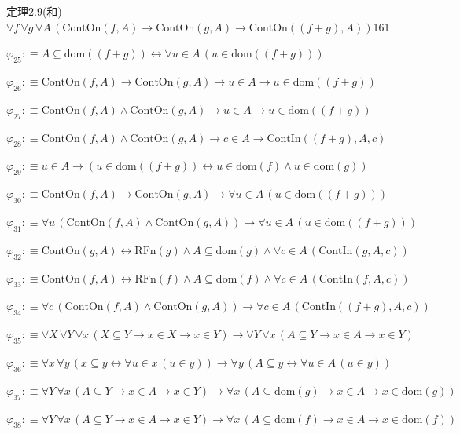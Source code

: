 \begin{fullproof}{定理2.9(和)}{$\forall f\,\forall g\,\forall A\,(\mathrm{ContOn}(f,A) \to \mathrm{ContOn}(g,A) \to \mathrm{ContOn}((f + g),A))$}{161}
\begin{abbrevlist}
\item $\varphi_{25} :\equiv A \subseteq \mathrm{dom}((f + g)) \leftrightarrow \forall u \in A\,(u \in \mathrm{dom}((f + g)))$
\item $\varphi_{26} :\equiv \mathrm{ContOn}(f,A) \to \mathrm{ContOn}(g,A) \to u \in A \to u \in \mathrm{dom}((f + g))$
\item $\varphi_{27} :\equiv \mathrm{ContOn}(f,A) \land \mathrm{ContOn}(g,A) \to u \in A \to u \in \mathrm{dom}((f + g))$
\item $\varphi_{28} :\equiv \mathrm{ContOn}(f,A) \land \mathrm{ContOn}(g,A) \to c \in A \to \mathrm{ContIn}((f + g),A,c)$
\item $\varphi_{29} :\equiv u \in A \to (u \in \mathrm{dom}((f + g)) \leftrightarrow u \in \mathrm{dom}(f) \land u \in \mathrm{dom}(g))$
\item $\varphi_{30} :\equiv \mathrm{ContOn}(f,A) \to \mathrm{ContOn}(g,A) \to \forall u \in A\,(u \in \mathrm{dom}((f + g)))$
\item $\varphi_{31} :\equiv \forall u\,(\mathrm{ContOn}(f,A) \land \mathrm{ContOn}(g,A)) \to \forall u \in A\,(u \in \mathrm{dom}((f + g)))$
\item $\varphi_{32} :\equiv \mathrm{ContOn}(g,A) \leftrightarrow \mathrm{RFn}(g) \land A \subseteq \mathrm{dom}(g) \land \forall c \in A\,(\mathrm{ContIn}(g,A,c))$
\item $\varphi_{33} :\equiv \mathrm{ContOn}(f,A) \leftrightarrow \mathrm{RFn}(f) \land A \subseteq \mathrm{dom}(f) \land \forall c \in A\,(\mathrm{ContIn}(f,A,c))$
\item $\varphi_{34} :\equiv \forall c\,(\mathrm{ContOn}(f,A) \land \mathrm{ContOn}(g,A)) \to \forall c \in A\,(\mathrm{ContIn}((f + g),A,c))$
\item $\varphi_{35} :\equiv \forall X\,\forall Y\,\forall x\,(X \subseteq Y \to x \in X \to x \in Y) \to \forall Y\,\forall x\,(A \subseteq Y \to x \in A \to x \in Y)$
\item $\varphi_{36} :\equiv \forall x\,\forall y\,(x \subseteq y \leftrightarrow \forall u \in x\,(u \in y)) \to \forall y\,(A \subseteq y \leftrightarrow \forall u \in A\,(u \in y))$
\item $\varphi_{37} :\equiv \forall Y\,\forall x\,(A \subseteq Y \to x \in A \to x \in Y) \to \forall x\,(A \subseteq \mathrm{dom}(g) \to x \in A \to x \in \mathrm{dom}(g))$
\item $\varphi_{38} :\equiv \forall Y\,\forall x\,(A \subseteq Y \to x \in A \to x \in Y) \to \forall x\,(A \subseteq \mathrm{dom}(f) \to x \in A \to x \in \mathrm{dom}(f))$

\end{abbrevlist}
\end{fullproof}
